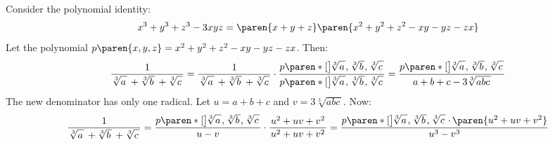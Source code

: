 Consider the polynomial identity:
\begin{equation*}
  x^3 + y^3 + z^3 - 3 x y z = \paren{x + y + z} \paren{x^2 + y^2 + z^2 - x y - y z - z x}
\end{equation*}
Let the polynomial $p\paren{x, y, z} = x^2 + y^2 + z^2 - x y - y z - z x$.
Then:
\begin{equation*}
  \frac{1}{\mspace{1mu}
           \sqrt[3]{a \vphantom{bc} \mspace{2mu}} \,
           + \sqrt[3]{b \vphantom{ac} \mspace{2mu}} \,
           + \sqrt[3]{c \vphantom{ab} \mspace{2mu}}
          \mspace{1mu}}
  = \frac{1}{\mspace{1mu}
             \sqrt[3]{a \vphantom{bc} \mspace{2mu}} \,
             + \sqrt[3]{b \vphantom{ac} \mspace{2mu}} \,
             + \sqrt[3]{c \vphantom{ab} \mspace{2mu}}
            \mspace{1mu}}
    \cdot \frac{p\paren*[\big]{\mspace{-2mu}
                               \sqrt[3]{a \vphantom{bc} \mspace{2mu}}, \mspace{1mu}
                               \sqrt[3]{b \vphantom{ac} \mspace{2mu}}, \mspace{1mu}
                               \sqrt[3]{c \vphantom{ab} \mspace{2mu}} \mspace{1mu}}}
               {p\paren*[\big]{\mspace{-2mu}
                               \sqrt[3]{a \vphantom{bc} \mspace{2mu}}, \mspace{1mu}
                               \sqrt[3]{b \vphantom{ac} \mspace{2mu}}, \mspace{1mu}
                               \sqrt[3]{c \vphantom{ab} \mspace{2mu}} \mspace{1mu}}}
  = \frac{p\paren*[\big]{\mspace{-2mu}
                         \sqrt[3]{a \vphantom{bc} \mspace{2mu}}, \mspace{1mu}
                         \sqrt[3]{b \vphantom{ac} \mspace{2mu}}, \mspace{1mu}
                         \sqrt[3]{c \vphantom{ab} \mspace{2mu}} \mspace{1mu}}}
         {\mspace{2mu} a + b + c - 3 \sqrt[3]{a b c \mspace{2mu}} \mspace{2mu}}
\end{equation*}
The new denominator has only one radical.
Let $u = a + b + c$ and $v = 3 \sqrt[3]{a b c \mspace{2mu}}$. Now:
\begin{equation*}
  \frac{1}{\mspace{1mu}
           \sqrt[3]{a \vphantom{bc} \mspace{2mu}} \,
           + \sqrt[3]{b \vphantom{ac} \mspace{2mu}} \,
           + \sqrt[3]{c \vphantom{ab} \mspace{2mu}}
          \mspace{1mu}}
  = \frac{p\paren*[\big]{\mspace{-2mu}
                         \sqrt[3]{a \vphantom{bc} \mspace{2mu}}, \mspace{1mu}
                         \sqrt[3]{b \vphantom{ac} \mspace{2mu}}, \mspace{1mu}
                         \sqrt[3]{c \vphantom{ab} \mspace{2mu}} \mspace{1mu}}}
         {\mspace{2mu} u - v \mspace{2mu}}
    \cdot \frac{\mspace{2mu} u^2 + u v + v^2 \mspace{2mu}}
               {\mspace{2mu} u^2 + u v + v^2 \mspace{2mu}}
  = \frac{p\paren*[\big]{\mspace{-2mu}
                         \sqrt[3]{a \vphantom{bc} \mspace{2mu}}, \mspace{1mu}
                         \sqrt[3]{b \vphantom{ac} \mspace{2mu}}, \mspace{1mu}
                         \sqrt[3]{c \vphantom{ab} \mspace{2mu}} \mspace{1mu}}
          \mspace{-1mu} \cdot \mspace{-1mu}
          \paren{u^2 + u v + v^2}}
         {\mspace{1mu} u^3 - v^3 \mspace{1mu}}
\end{equation*}
